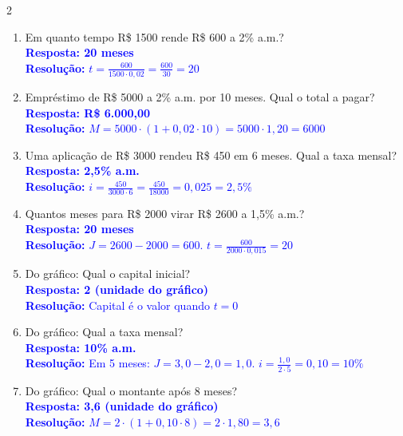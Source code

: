 \documentclass[11pt]{article}
\begin{document}
\begin{multicols}{2}
\begin{enumerate}[leftmargin=*, itemsep=2pt]
\item Em quanto tempo R\$ 1500 rende R\$ 600 a 2\% a.m.? \\
\textcolor{blue}{\textbf{Resposta: 20 meses}} \\
\textcolor{blue}{\textbf{Resolução:} $t = \frac{600}{1500 \cdot 0,02} = \frac{600}{30} = 20$}

\item Empréstimo de R\$ 5000 a 2\% a.m. por 10 meses. Qual o total a pagar? \\
\textcolor{blue}{\textbf{Resposta: R\$ 6.000,00}} \\
\textcolor{blue}{\textbf{Resolução:} $M = 5000 \cdot (1 + 0,02 \cdot 10) = 5000 \cdot 1,20 = 6000$}

\item Uma aplicação de R\$ 3000 rendeu R\$ 450 em 6 meses. Qual a taxa mensal? \\
\textcolor{blue}{\textbf{Resposta: 2,5\% a.m.}} \\
\textcolor{blue}{\textbf{Resolução:} $i = \frac{450}{3000 \cdot 6} = \frac{450}{18000} = 0,025 = 2,5\%$}

\item Quantos meses para R\$ 2000 virar R\$ 2600 a 1,5\% a.m.? \\
\textcolor{blue}{\textbf{Resposta: 20 meses}} \\
\textcolor{blue}{\textbf{Resolução:} $J = 2600 - 2000 = 600$. $t = \frac{600}{2000 \cdot 0,015} = 20$}

\item Do gráfico: Qual o capital inicial? \\
\textcolor{blue}{\textbf{Resposta: 2 (unidade do gráfico)}} \\
\textcolor{blue}{\textbf{Resolução:} Capital é o valor quando $t = 0$}

\item Do gráfico: Qual a taxa mensal? \\
\textcolor{blue}{\textbf{Resposta: 10\% a.m.}} \\
\textcolor{blue}{\textbf{Resolução:} Em 5 meses: $J = 3,0 - 2,0 = 1,0$. $i = \frac{1,0}{2 \cdot 5} = 0,10 = 10\%$}

\item Do gráfico: Qual o montante após 8 meses? \\
\textcolor{blue}{\textbf{Resposta: 3,6 (unidade do gráfico)}} \\
\textcolor{blue}{\textbf{Resolução:} $M = 2 \cdot (1 + 0,10 \cdot 8) = 2 \cdot 1,80 = 3,6$}


\end{enumerate}
\end{multicols}
\end{document}
